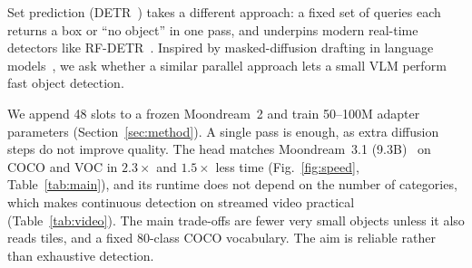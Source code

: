 \documentclass[10pt,twocolumn]{article}
\begin{document}
Set prediction (DETR~\citep{carion2020detr}) takes a different approach: a fixed set of
queries each returns a box or ``no object'' in one pass, and underpins modern real-time
detectors like RF-DETR~\citep{robinson2026rfdetr}. Inspired by masked-diffusion drafting
in language models~\citep{sahoo2024mdlm,nie2025llada}, we ask whether a similar parallel
approach lets a small VLM perform fast object detection.

We append 48 slots to a frozen Moondream~2 and train 50--100M adapter parameters
(Section~\ref{sec:method}). A single pass is enough, as extra diffusion steps
do not improve quality. The head matches Moondream~3.1 (9.3B)~\citep{moondream31} on COCO
and VOC in $2.3\times$ and $1.5\times$ less time (Fig.~\ref{fig:speed},
Table~\ref{tab:main}), and its runtime does not depend on the number of categories, which
makes continuous detection on streamed video practical (Table~\ref{tab:video}). The main
trade-offs are fewer very small objects unless it also reads tiles, and a fixed 80-class
COCO vocabulary. The aim is reliable rather than exhaustive detection.
\end{document}
